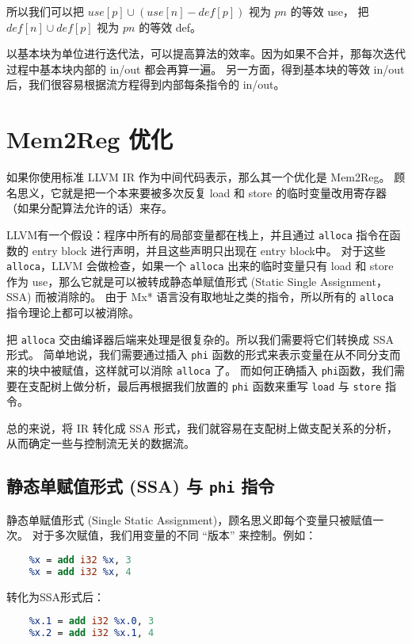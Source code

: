 所以我们可以把 $\mathit{use}[p] \cup (\mathit{use}[n] - \mathit{def}[p])$ 视为 $pn$ 的等效 use，
把 $\mathit{def}[n] \cup \mathit{def}[p]$ 视为 $pn$ 的等效 def。

以基本块为单位进行迭代法，可以提高算法的效率。因为如果不合并，那每次迭代过程中基本块内部的 in/out 都会再算一遍。
另一方面，得到基本块的等效 in/out 后，我们很容易根据流方程得到内部每条指令的 in/out。

\section{Mem2Reg 优化}\label{mem2reg}

如果你使用标准 LLVM IR 作为中间代码表示，那么其一个优化是 Mem2Reg。
顾名思义，它就是把一个本来要被多次反复 load 和 store 的临时变量改用寄存器（如果分配算法允许的话）来存。

LLVM有一个假设：程序中所有的局部变量都在栈上，并且通过 \texttt{alloca} 指令在函数的 entry block
进行声明，并且这些声明只出现在 entry block中。
对于这些 \texttt{alloca}，LLVM 会做检查，如果一个 \texttt{alloca} 出来的临时变量只有
load 和 store 作为 use，那么它就是可以被转成静态单赋值形式 (Static Single Assignment，SSA) 而被消除的。
由于 Mx* 语言没有取地址之类的指令，所以所有的 \texttt{alloca} 指令理论上都可以被消除。

把 \texttt{alloca} 交由编译器后端来处理是很复杂的。所以我们需要将它们转换成 SSA 形式。
简单地说，我们需要通过插入 \texttt{phi} 函数的形式来表示变量在从不同分支而来的块中被赋值，这样就可以消除
\texttt{alloca} 了。
而如何正确插入 \texttt{phi}函数，我们需要在支配树上做分析，最后再根据我们放置的
\texttt{phi} 函数来重写 \texttt{load} 与 \texttt{store} 指令。

总的来说，将 IR 转化成 SSA 形式，我们就容易在支配树上做支配关系的分析，从而确定一些与控制流无关的数据流。

\subsection{静态单赋值形式 (SSA) 与 \texttt{phi} 指令}

静态单赋值形式 (Single Static Assignment)，顾名思义即每个变量只被赋值一次。
对于多次赋值，我们用变量的不同 “版本” 来控制。例如：
\begin{lstlisting}[language=LLVM]
    %x = add i32 1, 2
    %x = add i32 %x, 3
    %x = add i32 %x, 4
\end{lstlisting}

转化为SSA形式后：
\begin{lstlisting}[language=LLVM]
    %x.0 = add i32 1, 2
    %x.1 = add i32 %x.0, 3
    %x.2 = add i32 %x.1, 4
\end{lstlisting}

